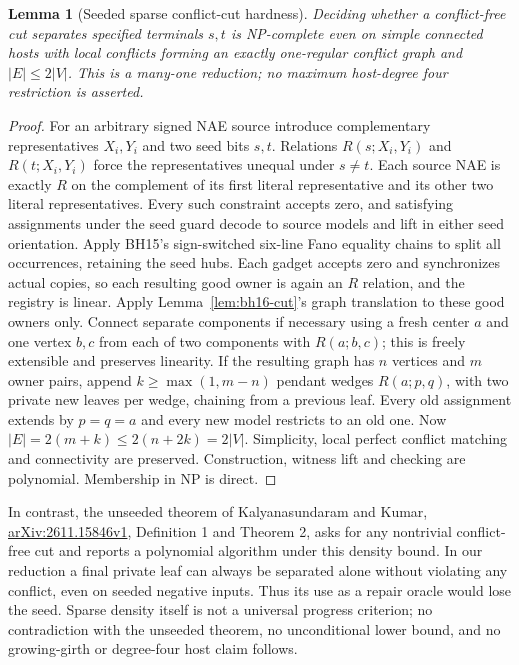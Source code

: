 \documentclass[11pt]{article}
\newtheorem{lemma}[theorem]{Lemma}
\begin{document}
\begin{lemma}[Seeded sparse conflict-cut hardness]\label{lem:bh16-sparse}
Deciding whether a conflict-free cut separates specified terminals $s,t$ is NP-complete even on simple connected hosts with local conflicts forming an exactly one-regular conflict graph and $|E|\le2|V|$. This is a many-one reduction; no maximum host-degree four restriction is asserted.
\end{lemma}
\begin{proof}
For an arbitrary signed NAE source introduce complementary representatives $X_i,Y_i$ and two seed bits $s,t$. Relations $R(s;X_i,Y_i)$ and $R(t;X_i,Y_i)$ force the representatives unequal under $s\ne t$. Each source NAE is exactly $R$ on the complement of its first literal representative and its other two literal representatives. Every such constraint accepts zero, and satisfying assignments under the seed guard decode to source models and lift in either seed orientation. Apply BH15's sign-switched six-line Fano equality chains to split all occurrences, retaining the seed hubs. Each gadget accepts zero and synchronizes actual copies, so each resulting good owner is again an $R$ relation, and the registry is linear. Apply Lemma~\ref{lem:bh16-cut}'s graph translation to these good owners only. Connect separate components if necessary using a fresh center $a$ and one vertex $b,c$ from each of two components with $R(a;b,c)$; this is freely extensible and preserves linearity. If the resulting graph has $n$ vertices and $m$ owner pairs, append $k\ge\max(1,m-n)$ pendant wedges $R(a;p,q)$, with two private new leaves per wedge, chaining from a previous leaf. Every old assignment extends by $p=q=a$ and every new model restricts to an old one. Now $|E|=2(m+k)\le2(n+2k)=2|V|$. Simplicity, local perfect conflict matching and connectivity are preserved. Construction, witness lift and checking are polynomial. Membership in NP is direct.
\end{proof}
In contrast, the unseeded theorem of Kalyanasundaram and Kumar, \href{https://arxiv.org/html/2611.15846v1}{arXiv:2611.15846v1}, Definition 1 and Theorem 2, asks for any nontrivial conflict-free cut and reports a polynomial algorithm under this density bound. In our reduction a final private leaf can always be separated alone without violating any conflict, even on seeded negative inputs. Thus its use as a repair oracle would lose the seed. Sparse density itself is not a universal progress criterion; no contradiction with the unseeded theorem, no unconditional lower bound, and no growing-girth or degree-four host claim follows.
\end{document}
